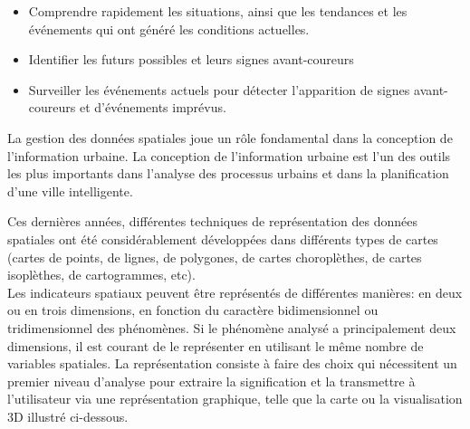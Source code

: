 \documentclass[french, a4paper, 12pt]{report}
\begin{document}
\begin{itemize}
\item Comprendre rapidement les situations, ainsi que les tendances et les événements qui ont généré les conditions actuelles.
\item Identifier les futurs possibles et leurs signes avant-coureurs
\item Surveiller les événements actuels pour détecter l'apparition de signes avant-coureurs et d'événements imprévus.\\
\end{itemize}

La gestion des données spatiales joue un rôle fondamental dans la conception de l’information urbaine. La conception de l'information urbaine est l'un des outils les plus importants dans l'analyse des processus urbains et dans la planification d'une ville intelligente.

Ces dernières années, différentes techniques de représentation des données spatiales ont été considérablement développées dans différents types de cartes (cartes de points, de lignes, de polygones, de cartes choroplèthes, de cartes isoplèthes, de cartogrammes, etc).\\ Les indicateurs spatiaux peuvent être représentés de différentes manières: en deux ou en trois dimensions, en fonction du caractère bidimensionnel ou tridimensionnel des phénomènes. Si le phénomène analysé a principalement deux dimensions, il est courant de le représenter en utilisant le même nombre de variables spatiales. 
La représentation consiste à faire des choix qui nécessitent un premier niveau d’analyse pour extraire la signification et la transmettre à l’utilisateur via une représentation graphique, telle que la carte ou la visualisation 3D illustré ci-dessous. 
\end{document}
